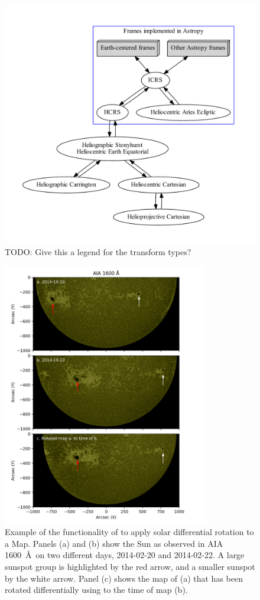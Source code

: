 \begin{figure}
  \includegraphics{figures/sunpy_frames.pdf}
\caption{TODO: Give this a legend for the transform types?}
\label{fig:image2}
\end{figure}

\begin{figure}
\center
  \includegraphics[width = 0.8\textwidth]{figures/diff_rot_aia1600.png}
\caption{Example of the functionality of \sunpy to apply solar differential rotation to a Map. Panels (a) and (b) show the Sun as observed in AIA 1600~\AA\ on two different days, 2014-02-20 and 2014-02-22. A large sunspot group is highlighted by the red arrow, and a smaller sunspot by the white arrow. Panel (c) shows the map of (a) that has been rotated differentially using \sunpy to the time of map (b).}
\label{fig:diff_rot}
\end{figure}